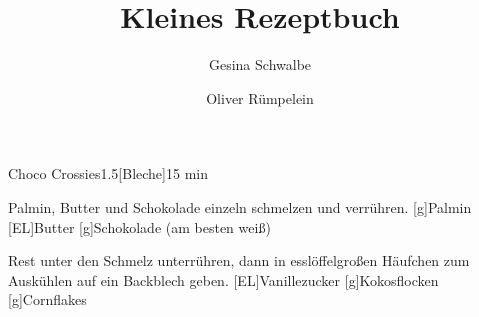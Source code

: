 \documentclass[parskip=half,ngerman]{scrartcl}
\title{Kleines Rezeptbuch}
\author{Gesina Schwalbe \and Oliver Rümpelein}
\begin{document}
\maketitle

\begin{recipe}{Choco Crossies}{1.5}[Bleche]{15 min}
  \begin{step}{%
      Palmin, Butter und Schokolade einzeln schmelzen und verrühren.%
    }
    [\si{\gram}]{Palmin}
	[EL]{Butter}
	[\si{\gram}]{Schokolade (am besten weiß)}
  \end{step}
  \begin{step}{%
      Rest unter den Schmelz unterrühren, 
      dann in esslöffelgroßen Häufchen zum Auskühlen 
      auf ein Backblech geben.%
    }
    [EL]{Vanillezucker}
	[\si{\gram}]{Kokosflocken}
	[\si{\gram}]{Cornflakes}
  \end{step}
\end{recipe}
\end{document}

